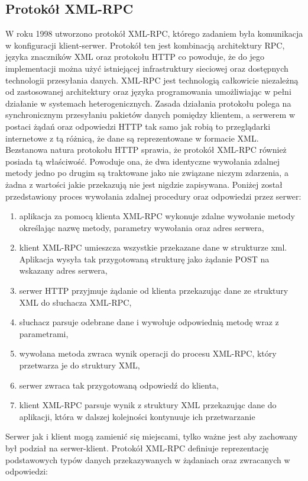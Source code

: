 \subsection{Protokół XML-RPC}
W roku 1998 utworzono protokół XML-RPC, którego zadaniem była komunikacja w konfiguracji klient-serwer. Protokół ten jest kombinacją architektury RPC, języka znaczników XML oraz protokołu HTTP co powoduje, że do jego implementacji można użyć istniejącej infrastruktury sieciowej oraz dostępnych technologii przesyłania danych\cite{laurent2001programming}. XML-RPC jest technologią całkowicie niezależną od zastosowanej architektury oraz języka programowania umożliwiając w pełni działanie w systemach heterogenicznych. Zasada działania protokołu polega na synchronicznym przesyłaniu pakietów danych pomiędzy klientem, a serwerem w postaci żądań oraz odpowiedzi HTTP tak samo jak robią to przeglądarki internetowe z tą różnicą, że dane są reprezentowane w formacie XML\@. Bezstanowa natura protokołu HTTP sprawia, że protokół XML-RPC również posiada tą właściwość. Powoduje ona, że dwa identyczne wywołania zdalnej metody jedno po drugim są traktowane jako nie związane niczym zdarzenia, a żadna z wartości jakie przekazują nie jest nigdzie zapisywana. Poniżej został przedstawiony proces wywołania zdalnej procedury oraz odpowiedzi przez serwer:
\begin{enumerate}
  \item aplikacja za pomocą klienta XML-RPC wykonuje zdalne wywołanie metody \\ określając nazwę metody, parametry wywołania oraz adres serwera,
  \item klient XML-RPC umieszcza wszystkie przekazane dane w strukturze xml.
        Aplikacja wysyła tak przygotowaną strukturę jako żądanie POST na wskazany adres serwera,
  \item serwer HTTP przyjmuje żądanie od klienta przekazując dane ze struktury XML do słuchacza XML-RPC,
  \item słuchacz parsuje odebrane dane i wywołuje odpowiednią metodę wraz z parametrami,
  \item wywołana metoda zwraca wynik operacji do procesu XML-RPC, który przetwarza je do struktury XML,
  \item serwer zwraca tak przygotowaną odpowiedź do klienta,
  \item klient XML-RPC parsuje wynik z struktury XML przekazując dane do aplikacji, która w dalszej kolejności kontynuuje ich przetwarzanie
\end{enumerate}
Serwer jak i klient mogą zamienić się miejscami, tylko ważne jest aby zachowany był podział na serwer-klient. Protokół XML-RPC definiuje reprezentację podstawowych typów danych przekazywanych w żądaniach oraz zwracanych w odpowiedzi:
